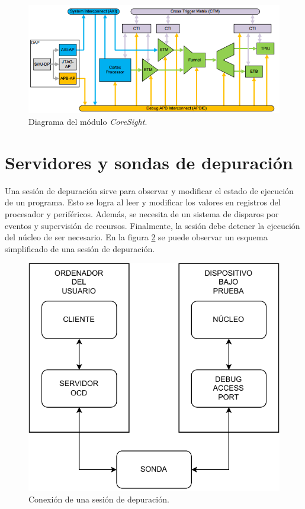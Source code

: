 \begin{figure}[htbp]
	\centering
	\includegraphics[width=\textwidth]{./Figures/coresight.png}
    \caption{Diagrama del módulo \emph{CoreSight}\protect\footnotemark.}
	\label{fig:coresight}
\end{figure}

\section{Servidores y sondas de depuración}
\label{sec:depuracion}

Una sesión de depuración sirve para observar y modificar el estado de ejecución de un programa.
Esto se logra al leer y modificar los valores en registros del procesador y periféricos.
Además, se necesita de un sistema de disparos por eventos y supervisión de recursos.
Finalmente, la sesión debe detener la ejecución del núcleo de ser necesario.
En la figura \ref{fig:debug} se puede observar un esquema simplificado de una sesión de depuración.

\begin{figure}[htbp]
	\centering
	\includegraphics[width=.8\textwidth]{./Figures/debug.pdf}
    \caption{Conexión de una sesión de depuración.}
	\label{fig:debug}
\end{figure}

